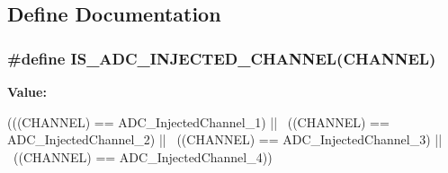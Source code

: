 \subsection{Define Documentation}
\hypertarget{group__ADC__injected__channel__selection_gae0bbfb5dbad0fbac8b672db6f63cf8d0}{
\subsubsection[{IS\_\-ADC\_\-INJECTED\_\-CHANNEL}]{\setlength{\rightskip}{0pt plus 5cm}\#define IS\_\-ADC\_\-INJECTED\_\-CHANNEL(CHANNEL)}}
\label{group__ADC__injected__channel__selection_gae0bbfb5dbad0fbac8b672db6f63cf8d0}
{\bfseries Value:}
\begin{DoxyCode}
(((CHANNEL) == ADC_InjectedChannel_1) || \
                                          ((CHANNEL) == ADC_InjectedChannel_2) ||
       \
                                          ((CHANNEL) == ADC_InjectedChannel_3) ||
       \
                                          ((CHANNEL) == ADC_InjectedChannel_4))
\end{DoxyCode}
